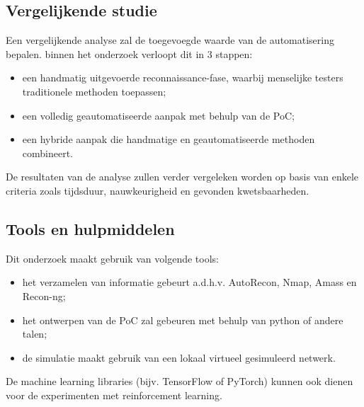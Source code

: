 



\subsection{Vergelijkende studie}

Een vergelijkende analyse zal de toegevoegde waarde van de automatisering bepalen. binnen het onderzoek verloopt dit in 3 stappen:

\begin{itemize}
    \item een handmatig uitgevoerde reconnaissance-fase, waarbij menselijke testers traditionele methoden toepassen;
    \item een volledig geautomatiseerde aanpak met behulp van de PoC;
    \item een hybride aanpak die handmatige en geautomatiseerde methoden combineert.
\end{itemize}

De resultaten van de analyse zullen verder vergeleken worden op basis van enkele criteria zoals tijdsduur, nauwkeurigheid en gevonden kwetsbaarheden.

\subsection{Tools en hulpmiddelen}

Dit onderzoek maakt gebruik van volgende tools: 

\begin{itemize}
    \item het verzamelen van informatie gebeurt a.d.h.v. AutoRecon, Nmap, Amass en Recon-ng;
    \item het ontwerpen van de PoC zal gebeuren met behulp van python of andere talen;
    \item de simulatie maakt gebruik van een lokaal virtueel gesimuleerd netwerk.
\end{itemize}

De machine learning libraries (bijv. TensorFlow of PyTorch) kunnen ook dienen voor de experimenten met reinforcement learning.

